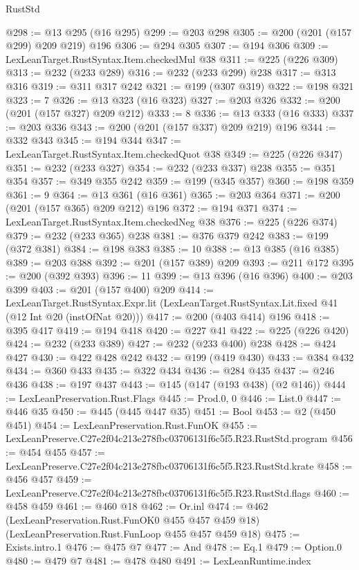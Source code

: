 \begin{lexlean}{RustStd}
\begin{coremodule}
@298 := @13 @295 (@16 @295)
@299 := @203 @298
@305 := @200 (@201 (@157 @299) @209 @219) @196
@306 := @294 @305
@307 := @194 @306
@309 := LexLeanTarget.RustSyntax.Item.checkedMul @38
@311 := @225 (@226 @309)
@313 := @232 (@233 @289)
@316 := @232 (@233 @299) @238
@317 := @313 @316
@319 := @311 @317 @242
@321 := @199 (@307 @319)
@322 := @198 @321
@323 := 7
@326 := @13 @323 (@16 @323)
@327 := @203 @326
@332 := @200 (@201 (@157 @327) @209 @212)
@333 := 8
@336 := @13 @333 (@16 @333)
@337 := @203 @336
@343 := @200 (@201 (@157 @337) @209 @219) @196
@344 := @332 @343
@345 := @194 @344
@347 := LexLeanTarget.RustSyntax.Item.checkedQuot @38
@349 := @225 (@226 @347)
@351 := @232 (@233 @327)
@354 := @232 (@233 @337) @238
@355 := @351 @354
@357 := @349 @355 @242
@359 := @199 (@345 @357)
@360 := @198 @359
@361 := 9
@364 := @13 @361 (@16 @361)
@365 := @203 @364
@371 := @200 (@201 (@157 @365) @209 @212) @196
@372 := @194 @371
@374 := LexLeanTarget.RustSyntax.Item.checkedNeg @38
@376 := @225 (@226 @374)
@379 := @232 (@233 @365) @238
@381 := @376 @379 @242
@383 := @199 (@372 @381)
@384 := @198 @383
@385 := 10
@388 := @13 @385 (@16 @385)
@389 := @203 @388
@392 := @201 (@157 @389) @209
@393 := @211 @172
@395 := @200 (@392 @393)
@396 := 11
@399 := @13 @396 (@16 @396)
@400 := @203 @399
@403 := @201 (@157 @400) @209
@414 := LexLeanTarget.RustSyntax.Expr.lit
    (LexLeanTarget.RustSyntax.Lit.fixed @41 (@12 Int @20 (instOfNat @20)))
@417 := @200 (@403 @414) @196
@418 := @395 @417
@419 := @194 @418
@420 := @227 @41
@422 := @225 (@226 @420)
@424 := @232 (@233 @389)
@427 := @232 (@233 @400) @238
@428 := @424 @427
@430 := @422 @428 @242
@432 := @199 (@419 @430)
@433 := @384 @432
@434 := @360 @433
@435 := @322 @434
@436 := @284 @435
@437 := @246 @436
@438 := @197 @437
@443 := @145 (@147 (@193 @438) (@2 @146))
@444 := LexLeanPreservation.Rust.Flags
@445 := Prod.{0, 0}
@446 := List.{0}
@447 := @446 @35
@450 := @445 (@445 @447 @35)
@451 := Bool
@453 := @2 (@450 @451)
@454 := LexLeanPreservation.Rust.FunOK
@455 := LexLeanPreserve.C27e2f04c213e278fbc03706131f6c5f5.R23.RustStd.program
@456 := @454 @455
@457 := LexLeanPreserve.C27e2f04c213e278fbc03706131f6c5f5.R23.RustStd.krate
@458 := @456 @457
@459 := LexLeanPreserve.C27e2f04c213e278fbc03706131f6c5f5.R23.RustStd.flags
@460 := @458 @459
@461 := @460 @18
@462 := Or.inl
@474 := @462
    (LexLeanPreservation.Rust.FunOK0 @455 @457 @459 @18)
    (LexLeanPreservation.Rust.FunLoop @455 @457 @459 @18)
@475 := Exists.intro.{1}
@476 := @475 @7
@477 := And
@478 := Eq.{1}
@479 := Option.{0}
@480 := @479 @7
@481 := @478 @480
@491 := LexLeanRuntime.index

\end{coremodule}
\end{lexlean}

